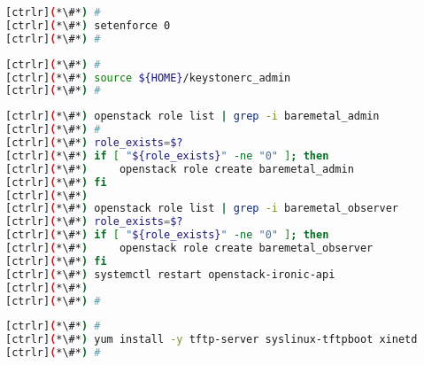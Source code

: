 \begin{lstlisting}[language=bash,keywords={}]
[ctrlr](*\#*) #
[ctrlr](*\#*) setenforce 0
[ctrlr](*\#*) #
\end{lstlisting}
\begin{lstlisting}[language=bash,keywords={}]
[ctrlr](*\#*) #
[ctrlr](*\#*) source ${HOME}/keystonerc_admin
[ctrlr](*\#*) #
\end{lstlisting}
\begin{lstlisting}[language=bash,keywords={}][ctrlr](*\#*) openstack role list | grep -i baremetal_admin
[ctrlr](*\#*) #
[ctrlr](*\#*) role_exists=$?
[ctrlr](*\#*) if [ "${role_exists}" -ne "0" ]; then 
[ctrlr](*\#*)     openstack role create baremetal_admin
[ctrlr](*\#*) fi
[ctrlr](*\#*) 
[ctrlr](*\#*) openstack role list | grep -i baremetal_observer
[ctrlr](*\#*) role_exists=$?
[ctrlr](*\#*) if [ "${role_exists}" -ne "0" ]; then 
[ctrlr](*\#*)     openstack role create baremetal_observer
[ctrlr](*\#*) fi
[ctrlr](*\#*) systemctl restart openstack-ironic-api
[ctrlr](*\#*) 
[ctrlr](*\#*) #
\end{lstlisting}
\begin{lstlisting}[language=bash,keywords={}]
[ctrlr](*\#*) #
[ctrlr](*\#*) yum install -y tftp-server syslinux-tftpboot xinetd
[ctrlr](*\#*) #
\end{lstlisting}
